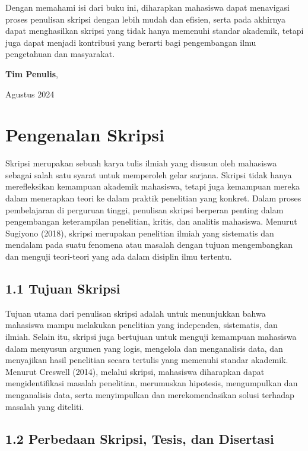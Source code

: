 \documentclass[
  indonesian,
  letterpaper,
  DIV=11,
  numbers=noendperiod]{scrreprt}
\begin{document}
Dengan memahami isi dari buku ini, diharapkan mahasiswa dapat menavigasi
proses penulisan skripsi dengan lebih mudah dan efisien, serta pada
akhirnya dapat menghasilkan skripsi yang tidak hanya memenuhi standar
akademik, tetapi juga dapat menjadi kontribusi yang berarti bagi
pengembangan ilmu pengetahuan dan masyarakat.

\hfill\break

\textbf{Tim Penulis},

Agustus 2024


\chapter{Pengenalan Skripsi}\label{pengenalan-skripsi}

Skripsi merupakan sebuah karya tulis ilmiah yang disusun oleh mahasiswa
sebagai salah satu syarat untuk memperoleh gelar sarjana. Skripsi tidak
hanya merefleksikan kemampuan akademik mahasiswa, tetapi juga kemampuan
mereka dalam menerapkan teori ke dalam praktik penelitian yang konkret.
Dalam proses pembelajaran di perguruan tinggi, penulisan skripsi
berperan penting dalam pengembangan keterampilan penelitian, kritis, dan
analitis mahasiswa. Menurut Sugiyono (2018), skripsi merupakan
penelitian ilmiah yang sistematis dan mendalam pada suatu fenomena atau
masalah dengan tujuan mengembangkan dan menguji teori-teori yang ada
dalam disiplin ilmu tertentu.

\section{1.1 Tujuan Skripsi}\label{tujuan-skripsi}

Tujuan utama dari penulisan skripsi adalah untuk menunjukkan bahwa
mahasiswa mampu melakukan penelitian yang independen, sistematis, dan
ilmiah. Selain itu, skripsi juga bertujuan untuk menguji kemampuan
mahasiswa dalam menyusun argumen yang logis, mengelola dan menganalisis
data, dan menyajikan hasil penelitian secara tertulis yang memenuhi
standar akademik. Menurut Creswell (2014), melalui skripsi, mahasiswa
diharapkan dapat mengidentifikasi masalah penelitian, merumuskan
hipotesis, mengumpulkan dan menganalisis data, serta menyimpulkan dan
merekomendasikan solusi terhadap masalah yang diteliti.

\section{1.2 Perbedaan Skripsi, Tesis, dan
Disertasi}\label{perbedaan-skripsi-tesis-dan-disertasi}
\end{document}
